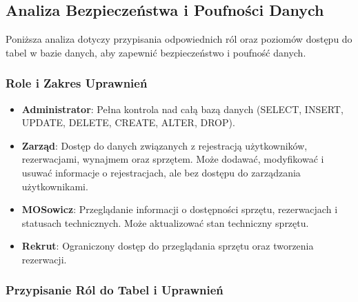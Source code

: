 \documentclass{article}
\begin{document}
\subsection{Analiza Bezpieczeństwa i Poufności Danych}

Poniższa analiza dotyczy przypisania odpowiednich ról oraz poziomów dostępu do tabel w bazie danych, aby zapewnić bezpieczeństwo i poufność danych.

\subsubsection{Role i Zakres Uprawnień}

\begin{itemize}
    \item \textbf{Administrator}: Pełna kontrola nad całą bazą danych (SELECT, INSERT, UPDATE, DELETE, CREATE, ALTER, DROP).
    \item \textbf{Zarząd}: Dostęp do danych związanych z rejestracją użytkowników, rezerwacjami, wynajmem oraz sprzętem. Może dodawać, modyfikować i usuwać informacje o rejestracjach, ale bez dostępu do zarządzania użytkownikami.
    \item \textbf{MOSowicz}: Przeglądanie informacji o dostępności sprzętu, rezerwacjach i statusach technicznych. Może aktualizować stan techniczny sprzętu.
    \item \textbf{Rekrut}: Ograniczony dostęp do przeglądania sprzętu oraz tworzenia rezerwacji.
\end{itemize}

\subsubsection{Przypisanie Ról do Tabel i Uprawnień}
\end{document}
